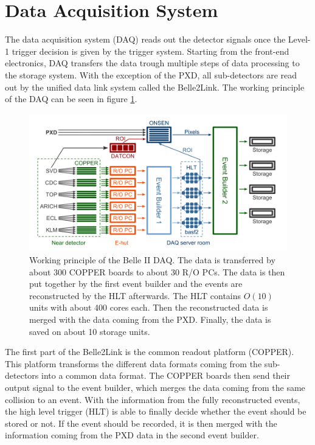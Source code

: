 \documentclass[a4paper,11pt,twosided,final,german,openbib,pdftex,listof=totoc,bibliography=totoc]{scrbook}
\begin{document}
\section{Data Acquisition System}
\label{sec:DAQ}

The data acquisition system (DAQ) reads out the detector signals once the Level-1 trigger decision is given by the trigger system. Starting from the front-end electronics, DAQ transfers the data trough multiple steps of data processing to the storage system. With the exception of the PXD, all sub-detectors are read out by the unified data link system called the Belle2Link. The working principle of the DAQ can be seen in figure \ref{fig:DAQ}.

\begin{figure}[h!]
	\centering
	\includegraphics[width=\textwidth]{Bilder/DAQ}
	\caption[Working Principle of the DAQ]{Working principle of the Belle II DAQ. The data is transferred by about 300 COPPER boards to about 30 R/O PCs. The data is then put together by the first event builder and the events are reconstructed by the HLT afterwards. The HLT contains $O(10)$ units with about 400 cores each. Then the reconstructed data is merged with the data coming from the PXD. Finally, the data is saved on about 10 storage units. \cite{Filippo:1097}}
	\label{fig:DAQ}
\end{figure}

The first part of the Belle2Link is the common readout platform (COPPER). This platform transforms the different data formats coming from the sub-detectors into a common data format. The COPPER boards then send their output signal to the event builder, which merges the data coming from the same collision to an event. With the information from the fully reconstructed events, the high level trigger (HLT) is able to finally decide whether the event should be stored or not. If the event should be recorded, it is then merged with the information coming from the PXD data in the second event builder.
\end{document}
